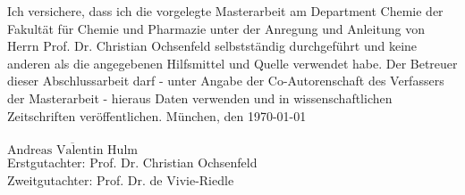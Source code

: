\begin{titlepage}

Ich versichere, dass ich die vorgelegte Masterarbeit am Department Chemie der Fakultät für Chemie und Pharmazie unter der Anregung und Anleitung von Herrn Prof. Dr. Christian Ochsenfeld selbstständig durchgeführt und keine anderen als die angegebenen Hilfsmittel und Quelle verwendet habe.
Der Betreuer dieser Abschlussarbeit darf - unter Angabe der Co-Autorenschaft des Verfassers der Masterarbeit - hieraus Daten verwenden und in  wissenschaftlichen Zeitschriften veröffentlichen.
\vfill
\vspace{2cm}
München, den \today \\
\vspace{1cm} \\
$\overline{\text{Andreas Valentin Hulm}}$ \\[4.5cm]

Erstgutachter: Prof. Dr. Christian Ochsenfeld \\
Zweitgutachter: Prof. Dr. de Vivie-Riedle \\
\vfill
\end{titlepage}
